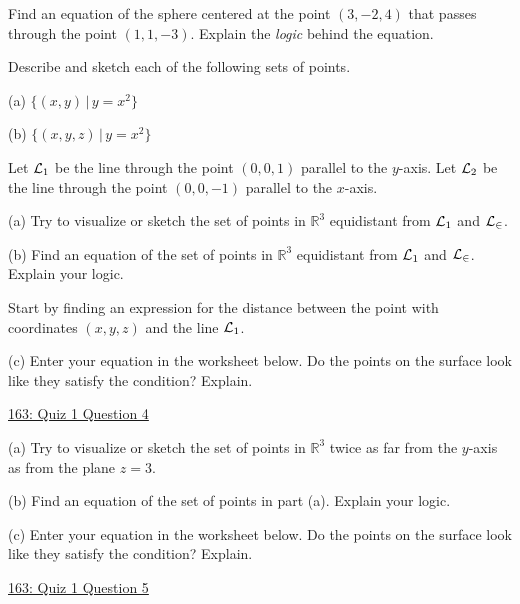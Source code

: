 \documentclass{ximera}
\begin{document}
\begin{question}  \label{Q:9df33334}
Find an equation of the sphere centered at the point $(3,-2,4)$ that passes through the point $(1,1,-3)$. Explain the \emph{logic} behind the equation.
\end{question}

\begin{question}  \label{Q44435313}
Describe and sketch each of the following sets of points.

(a) $\{ (x,y) \, | \, y=x^2 \}$

(b) $\{ (x,y,z) \, | \, y=x^2 \}$
\end{question}


\begin{question}  \label{Qpo8873032}
Let ${\cal L}_1$ be the line through the point $(0,0,1)$ parallel to the $y$-axis. Let ${\cal L}_2$ be the line through the point $(0,0,-1)$ parallel to the $x$-axis.

(a) Try to visualize or sketch the set of points in $\mathbb{R}^3$ equidistant from ${\cal L}_1$ and ${\cal L_2}$.

(b) Find an equation of the set of points in $\mathbb{R}^3$ equidistant from ${\cal L}_1$ and ${\cal L_2}$. Explain your logic.

\begin{hint}
Start by finding an expression for the distance between the point with coordinates $(x,y,z)$ and the line ${\cal L}_1$.
\end{hint}

(c) Enter  your equation in the worksheet below. Do the points on the surface look like they satisfy the condition? Explain.

\begin{onlineOnly}
    \begin{center}
\end{center}
\end{onlineOnly}

\href{https://www.desmos.com/3d/pzksnds2pe}{163: Quiz 1 Question 4}


\end{question}

\begin{question}  \label{Qpdfdsfe032}
(a) Try to visualize or sketch the set of points in $\mathbb{R}^3$  twice as far from the $y$-axis as from the plane $z=3$. 

(b) Find an equation of the set of points in part (a). Explain your logic.

(c) Enter  your equation in the worksheet below. Do the points on the surface look like they satisfy the condition? Explain.

\begin{onlineOnly}
    \begin{center}
\end{center}
\end{onlineOnly}

\href{https://www.desmos.com/3d/qvin80o05t}{163: Quiz 1 Question 5}
\end{question}
\end{document}
